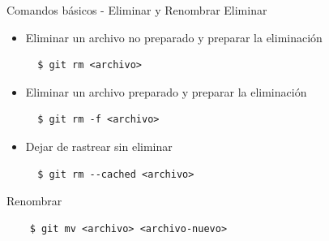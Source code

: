 \begin{frame}[fragile]{Comandos básicos - Eliminar y Renombrar}
  \alert{Eliminar}
  \begin{itemize}
    \item Eliminar un archivo no preparado y preparar la eliminación \warnning
    \begin{verbatim}
  $ git rm <archivo>
    \end{verbatim}
    \item Eliminar un archivo preparado y preparar la eliminación \warnning
    \begin{verbatim}
  $ git rm -f <archivo>
    \end{verbatim}
    \item Dejar de rastrear sin eliminar
    \begin{verbatim}
  $ git rm --cached <archivo>
    \end{verbatim}
  \end{itemize}

  \alert{Renombrar}
  \begin{verbatim}
    $ git mv <archivo> <archivo-nuevo>
  \end{verbatim}

\end{frame}
